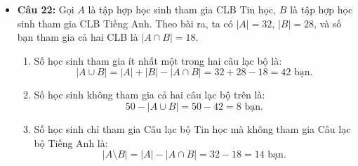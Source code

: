 \documentclass[12pt,a4paper]{article}
\begin{document}
\begin{itemize}[leftmargin=0.6cm, itemsep=6pt]
    \item \textbf{Câu 22:}
    Gọi $A$ là tập hợp học sinh tham gia CLB Tin học, $B$ là tập hợp học sinh tham gia CLB Tiếng Anh.
    Theo bài ra, ta có $|A| = 32$, $|B| = 28$, và số bạn tham gia cả hai CLB là $|A \cap B| = 18$.
    \begin{enumerate}
        \item Số học sinh tham gia ít nhất một trong hai câu lạc bộ là:
        \[
        |A \cup B| = |A| + |B| - |A \cap B| = 32 + 28 - 18 = 42\text{ bạn}.
        \]
        \item Số học sinh không tham gia cả hai câu lạc bộ trên là:
        \[
        50 - |A \cup B| = 50 - 42 = 8\text{ bạn}.
        \]
        \item Số học sinh chỉ tham gia Câu lạc bộ Tin học mà không tham gia Câu lạc bộ Tiếng Anh là:
        \[
        |A \setminus B| = |A| - |A \cap B| = 32 - 18 = 14\text{ bạn}.
        \]
    \end{enumerate}
\end{itemize}
\end{document}
